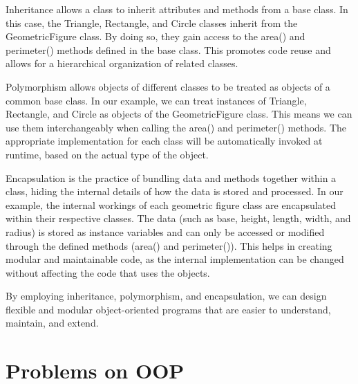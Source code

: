 \documentclass[12pt]{book}
\begin{document}
Inheritance allows a class to inherit attributes and methods from a base class. In this case, the Triangle, Rectangle, and Circle classes inherit from the GeometricFigure class. By doing so, they gain access to the area() and perimeter() methods defined in the base class. This promotes code reuse and allows for a hierarchical organization of related classes.

Polymorphism allows objects of different classes to be treated as objects of a common base class. In our example, we can treat instances of Triangle, Rectangle, and Circle as objects of the GeometricFigure class. This means we can use them interchangeably when calling the area() and perimeter() methods. The appropriate implementation for each class will be automatically invoked at runtime, based on the actual type of the object.

Encapsulation is the practice of bundling data and methods together within a class, hiding the internal details of how the data is stored and processed. In our example, the internal workings of each geometric figure class are encapsulated within their respective classes. The data (such as base, height, length, width, and radius) is stored as instance variables and can only be accessed or modified through the defined methods (area() and perimeter()). This helps in creating modular and maintainable code, as the internal implementation can be changed without affecting the code that uses the objects.

By employing inheritance, polymorphism, and encapsulation, we can design flexible and modular object-oriented programs that are easier to understand, maintain, and extend.

\newpage
\section{Problems on OOP}
\end{document}

